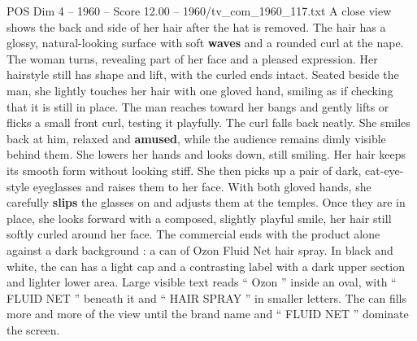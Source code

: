 \begin{textsample}{POS Dim 4 – 1960 – Score 12.00 – 1960/tv\_com\_1960\_117.txt}
A close view shows the back and side of her hair after the hat is removed.
The hair has a glossy, natural-looking surface with soft \textbf{waves} and a rounded curl at the nape.
The woman turns, revealing part of her face and a pleased expression.
Her hairstyle still has shape and lift, with the curled ends intact.
Seated beside the man, she lightly touches her hair with one gloved hand, smiling as if checking that it is still in place.
The man reaches toward her bangs and gently lifts or flicks a small front curl, testing it playfully.
The curl falls back neatly.
She smiles back at him, relaxed and \textbf{amused}, while the audience remains dimly visible behind them.
She lowers her hands and looks down, still smiling.
Her hair keeps its smooth form without looking stiff.
She then picks up a pair of dark, cat-eye-style eyeglasses and raises them to her face.
With both gloved hands, she carefully \textbf{slips} the glasses on and adjusts them at the temples.
Once they are in place, she looks forward with a composed, slightly playful smile, her hair still softly curled around her face.
The commercial ends with the product alone against a dark background : a can of Ozon Fluid Net hair spray.
In black and white, the can has a light cap and a contrasting label with a dark upper section and lighter lower area.
Large visible text reads “ Ozon ” inside an oval, with “ FLUID NET ” beneath it and “ HAIR SPRAY ” in smaller letters.
The can fills more and more of the view until the brand name and “ FLUID NET ” dominate the screen.

\end{textsample}
